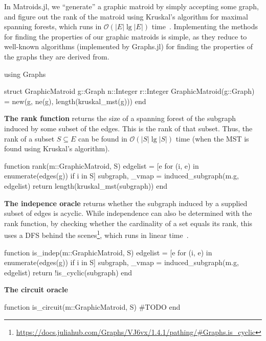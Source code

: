 In Matroids.jl, we ``generate'' a graphic matroid by simply accepting some graph, and figure out the rank of the matroid using Kruskal's algorithm for maximal spanning forests, which runs in $\mathcal{O}(|E| \lg |E|)$ time~\cite{Cormen2009-zm}. Implementing the methods for finding the properties of our graphic matroids is simple, as they reduce to well-known algorithms (implemented by Graphs.jl) for finding the properties of the graphs they are derived from. 

\begin{jllisting}
using Graphs

struct GraphicMatroid
  g::Graph
  n::Integer
  r::Integer
  GraphicMatroid(g::Graph) = new(g, ne(g), length(kruskal_mst(g)))
end
\end{jllisting}

\textbf{The rank function} returns the size of a spanning forest of the subgraph induced by some subset of the edges. This is the rank of that subset. Thus, the rank of a subset $S \subseteq E$ can be found in $\mathcal{O}(|S| \lg |S|)$ time (when the MST is found using Kruskal's algorithm).

\begin{jllisting}
function rank(m::GraphicMatroid, S)
  edgelist = [e for (i, e) in enumerate(edges(g)) if i in S]
  subgraph, _vmap = induced_subgraph(m.g, edgelist)
  return length(kruskal_mst(subgraph))
end
\end{jllisting}

\textbf{The indepence oracle} returns whether the subgraph induced by a supplied subset of edges is acyclic. While independence can also be determined with the rank function, by checking whether the cardinality of a set equals its rank, this uses a DFS behind the scenes\footnote{\href{https://docs.juliahub.com/Graphs/VJ6vx/1.4.1/pathing/\#Graphs.is\_cyclic}{https://docs.juliahub.com/Graphs/VJ6vx/1.4.1/pathing/\#Graphs.is\_cyclic}}, which runs in linear time~\cite{Cormen2009-zm}.

\begin{jllisting}
function is_indep(m::GraphicMatroid, S)
  edgelist = [e for (i, e) in enumerate(edges(g)) if i in S]
  subgraph, _vmap = induced_subgraph(m.g, edgelist)
  return !is_cyclic(subgraph)
end
\end{jllisting}

\textbf{The circuit oracle} \skelline
\begin{jllisting}
function is_circuit(m::GraphicMatroid, S)
  #TODO
end
\end{jllisting}

